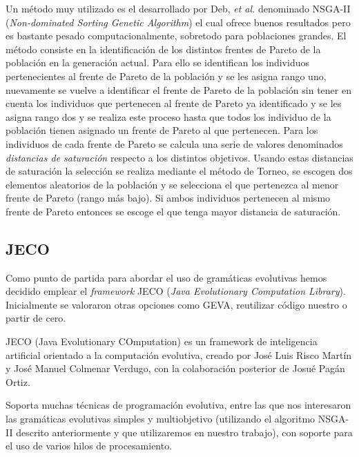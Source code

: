Un método muy utilizado es el desarrollado por Deb, \textit{et al.} denominado NSGA-II (\textit{Non-dominated Sorting Genetic Algorithm}) el cual ofrece buenos resultados pero es bastante pesado computacionalmente, sobretodo para poblaciones grandes\cite{deb2002fast}. El método consiste en la identificación de los distintos frentes de Pareto de la población en la generación actual. Para ello se identifican los individuos pertenecientes al frente de Pareto de la población y se les asigna rango uno, nuevamente se vuelve a identificar el frente de Pareto de la población sin tener en cuenta los individuos que pertenecen al frente de Pareto ya identificado y se les asigna rango dos y se realiza este proceso hasta que todos los individuo de la población tienen asignado un frente de Pareto al que pertenecen. Para los individuos de cada frente de Pareto se calcula una serie de valores denominados \textit{distancias de saturación} respecto a los distintos objetivos. Usando estas distancias de saturación la selección se realiza mediante el método de Torneo, se escogen dos elementos aleatorios de la población y se selecciona el que pertenezca al menor frente de Pareto (rango más bajo). Si ambos individuos pertenecen al mismo frente de Pareto entonces se escoge el que tenga mayor distancia de saturación.

\subsection{JECO}
Como punto de partida para abordar el uso de gramáticas evolutivas hemos decidido emplear el \textit{framework} JECO\cite{jecoGit} (\textit{Java Evolutionary Computation Library}). Inicialmente se valoraron otras opciones como  GEVA\cite{gevaGit}, reutilizar código nuestro o partir de cero.

JECO (Java Evolutionary COmputation) es un framework de inteligencia artificial orientado a la computación evolutiva, creado por José Luis Risco Martín y José Manuel Colmenar Verdugo, con la colaboración posterior de Josué Pagán Ortiz.

Soporta muchas técnicas de programación evolutiva, entre las que nos interesaron las gramáticas evolutivas simples y multiobjetivo (utilizando el algoritmo NSGA-II descrito anteriormente y que utilizaremos en nuestro trabajo), con soporte para el uso de varios hilos de procesamiento.
